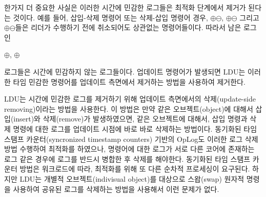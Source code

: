 한가지 더 중요한 사실은 이러한 시간에 민감한 로그들은 최적화 단계에서 제거가 된다는 것이다.
예를 들어, 삽입-삭제 명령어 또는 삭제-삽입 명령어 경우,
$\oplus$$\ominus$, $\oplus$$\ominus$ 
그리고 $\oplus$$\ominus$들은 리더가 수행하기 전에
 취소되어도 상관없는 명령어들이다. 
따라서 남은 로그인 
\begin{center}
 $\oplus$, $\oplus$
\end{center}
로그들은 시간에 민감하지 않는 로그들이다.
업데이트 명령어가 발생되면 LDU는 이러한 타임 민감한 명령어를 업데이트 측면에서 제거하는 방법을 
사용하여 제거한다.



LDU는 시간에 민감한 로그를 제거하기 위해 업데이트 측면에서의 삭제(update-side removing)이라는 방법을 사용한다.
이 방법은 만약 같은 오브젝트(object)에 대해서 삽입(insert)와 삭제(remove)가 발생하였으면, 같은 오브젝트에
대해서, 삽입 명령과 삭제 명령에 대한 로그를 업데이트 시점에 바로 바로 삭제하는 방법이다. 
동기화된 타임 스탬프 카운터(syncronized timestamp counters) 기반의 OpLog도 이러한 로그 삭제 방법 수행하여
최적화를 하였으나, 명령어에 대한 로그가 서로 다른 코어에 존재하는 로그 같은 경우에 로그를 반드시 병합한 후
 삭제를 해야한다.
동기화된 타임 스탬프 카운터 방법은 워크로드에 따라, 최적화를 위해 또 다른
순차적 프로세싱이 요구된다.
하지만 LDU는 개별적 오브젝트(indivisual object)를 대상으로 스왑(swap) 원자적 명령을
사용하여 공유된 로그를 삭제하는 방법을 사용해서 이런 문제가 없다.


